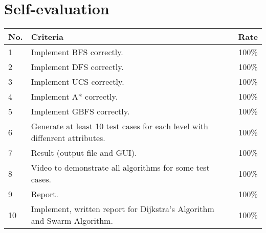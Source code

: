 \section{Self-evaluation}
\begin{center}
  \renewcommand{\arraystretch}{1.5}
  \begin{tabular}{|l|p{}|c|}
    \hline
    \textbf{No.} & \textbf{Criteria}                                                          & \textbf{Rate} \\ \hline
    1            & Implement BFS correctly.                                                   & 100\%         \\ \hline
    2            & Implement DFS correctly.                                                   & 100\%         \\ \hline
    3            & Implement UCS correctly.                                                   & 100\%         \\ \hline
    4            & Implement A* correctly.                                                    & 100\%         \\ \hline
    5            & Implement GBFS correctly.                                                  & 100\%         \\ \hline
    6            & Generate at least 10 test cases for each level with diffenrent attributes. & 100\%         \\ \hline
    7            & Result (output file and GUI).                                              & 100\%         \\ \hline
    8            & Video to demonstrate all algorithms for some test cases.                   & 100\%         \\ \hline
    9            & Report.                                                                    & 100\%         \\ \hline
    10           & Implement, written report for Dijkstra's Algorithm and Swarm Algorithm.    & 100\%         \\ \hline
  \end{tabular}
\end{center}
